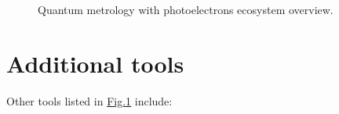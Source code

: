 \documentclass[letterpaper,10pt,english]{jupyterBook}
\begin{document}
\begin{figure}[htbp]
\centering
\capstart

\noindent{}
\caption{Quantum metrology with photoelectrons ecosystem overview.}\label{\detokenize{part1/platform_intro_071122:qm-platform-diag}}\end{figure}


\section{Additional tools}
\label{\detokenize{part1/platform_intro_071122:additional-tools}}\label{\detokenize{part1/platform_intro_071122:sect-platform-othertools}}
\sphinxAtStartPar
Other tools listed in \hyperref[\detokenize{part1/platform_intro_071122:qm-platform-diag}]{Fig.\@ \ref{\detokenize{part1/platform_intro_071122:qm-platform-diag}}} include:
\end{document}
